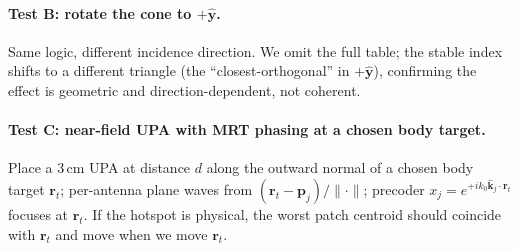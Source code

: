 \documentclass[journal]{IEEEtran}
\newcommand{\rr}{\bm{r}}
\begin{document}
\paragraph{Test B: rotate the cone to $+\hat{\bm y}$.} Same logic,
different incidence direction. We omit the full table; the stable
index shifts to a different triangle (the ``closest-orthogonal'' in
$+\hat{\bm y}$), confirming the effect is geometric and
direction-dependent, not coherent.

\paragraph{Test C: near-field UPA with MRT phasing at a chosen body
target.} Place a $3\,\mathrm{cm}$ UPA at distance $d$ along the
outward normal of a chosen body target $\rr_t$; per-antenna plane waves
from $(\rr_t-\bm p_j)/\lVert\cdot\rVert$; precoder
$x_j\!=\!e^{+ik_0\hat{\bm k}_j\cdot\rr_t}$ focuses at $\rr_t$. If the
hotspot is physical, the worst patch centroid should coincide with
$\rr_t$ and move when we move $\rr_t$.
\end{document}
